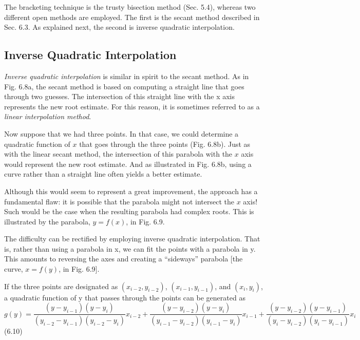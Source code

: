 \documentclass[../main.tex]{subfiles}
\begin{document}
The bracketing technique is the trusty bisection method (Sec. 5.4), whereas two different
open methods are employed. The first is the secant method described in Sec. 6.3. As
explained next, the second is inverse quadratic interpolation.\\

\subsection{Inverse Quadratic Interpolation}
\noindent \emph{Inverse quadratic interpolation} is similar in spirit to the secant method. As in Fig. 6.8a, the
secant method is based on computing a straight line that goes through two guesses. The
intersection of this straight line with the x axis represents the new root estimate. For this
reason, it is sometimes referred to as a \emph{linear interpolation method}.

Now suppose that we had three points. In that case, we could determine a quadratic
function of $x$ that goes through the three points (Fig. 6.8b). Just as with the linear secant
method, the intersection of this parabola with the $x$ axis would represent the new root estimate.
And as illustrated in Fig. 6.8b, using a curve rather than a straight line often yields a
better estimate.

Although this would seem to represent a great improvement, the approach has a fundamental
flaw: it is possible that the parabola might not intersect the $x$ axis! Such would be
the case when the resulting parabola had complex roots. This is illustrated by the parabola,
$y = f(x)$, in Fig. 6.9.

The difficulty can be rectified by employing inverse quadratic interpolation. That is,
rather than using a parabola in x, we can fit the points with a parabola in y. This amounts to
reversing the axes and creating a ``sideways'' parabola [the curve, $x = f(y)$, in Fig. 6.9].

If the three points are designated as $(x_{i-2}, y_{i-2})$, $(x_{i-1}, y_{i-1})$, and $(x_i, y_i)$, a quadratic
function of y that passes through the points can be generated as\\

$g(y) = \dfrac{(y-y_{i-1})(y-y_i)}{(y_{i-2}-y_{i-1})(y_{i-2}-y_i)}x_{i-2}+
\dfrac{(y-y_{i-2})(y-y_i)}{(y_{i-1}-y_{i-2})(y_{i-1}-y_i)}x_{i-1}+
\dfrac{(y-y_{i-2})(y-y_{i-1})}{(y_{i}-y_{i-2})(y_{i}-y_{i-1})}x_{i}$
\hfill (6.10)\\
\bigskip
\end{document}
